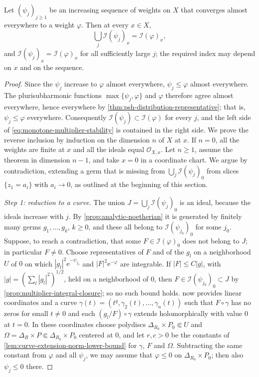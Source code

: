 \begin{theorem}\label{thm:monotone-multiplier-stability}
Let $(\psi_j)_{j\geq1}$ be an increasing sequence of weights on $X$ that converges almost everywhere to a weight $\varphi$. Then at every $x\in X$,
\begin{equation}\label{eq:monotone-multiplier-stability}
 \bigcup_j\mathcal I(\psi_j)_x=\mathcal I(\varphi)_x,
\end{equation}
and $\mathcal I(\psi_j)_x=\mathcal I(\varphi)_x$ for all sufficiently large $j$; the required index may depend on $x$ and on the sequence.
\end{theorem}
\begin{proof}
Since the $\psi_j$ increase to $\varphi$ almost everywhere, $\psi_j\leq\varphi$ almost everywhere. The plurisubharmonic functions $\max\{\psi_j,\varphi\}$ and $\varphi$ therefore agree almost everywhere, hence everywhere by \cref{thm:psh-distribution-representative}; that is, $\psi_j\leq\varphi$ everywhere. Consequently $\mathcal I(\psi_j)\subset\mathcal I(\varphi)$ for every $j$, and the left side of \eqref{eq:monotone-multiplier-stability} is contained in the right side. We prove the reverse inclusion by induction on the dimension $n$ of $X$ at $x$. If $n=0$, all the weights are finite at $x$ and all the ideals equal $\mathcal O_{X,x}$. Let $n\geq1$, assume the theorem in dimension $n-1$, and take $x=0$ in a coordinate chart. We argue by contradiction, extending a germ that is missing from $\bigcup_j\mathcal I(\psi_j)_0$ from slices $\{z_1=a_i\}$ with $a_i\to0$, as outlined at the beginning of this section.

\emph{Step 1: reduction to a curve.} The union $J=\bigcup_j\mathcal I(\psi_j)_0$ is an ideal, because the ideals increase with $j$. By \cref{prop:analytic-noetherian} it is generated by finitely many germs $g_1,\ldots,g_k$, $k\geq0$, and these all belong to $\mathcal I(\psi_{j_0})_0$ for some $j_0$. Suppose, to reach a contradiction, that some $F\in\mathcal I(\varphi)_0$ does not belong to $J$; in particular $F\neq0$. Choose representatives of $F$ and of the $g_l$ on a neighborhood $U$ of $0$ on which $|g_l|^2\mathrm e^{-\psi_{j_0}}$ and $|F|^2\mathrm e^{-\varphi}$ are integrable. If $|F|\leq C|g|$, with $|g|=(\sum_l|g_l|^2)^{1/2}$, held on a neighborhood of $0$, then $F\in\mathcal I(\psi_{j_0})_0\subset J$ by \cref{prop:multiplier-integral-closure}; so no such bound holds.  now provides linear coordinates and a curve $\gamma(t)=(t^q,\gamma_2(t),\ldots,\gamma_n(t))$ such that $F\circ\gamma$ has no zeros for small $t\neq0$ and each $(g_l/F)\circ\gamma$ extends holomorphically with value $0$ at $t=0$. In these coordinates choose polydiscs $\Delta_{R_0}\times P_0\Subset U$ and $\Omega=\Delta_R\times P\Subset\Delta_{R_0}\times P_0$ centered at $0$, and let $r,c>0$ be the constants of \cref{lem:curve-extension-norm-lower-bound} for $\gamma$, $F$ and $\Omega$. Subtracting the same constant from $\varphi$ and all $\psi_j$, we may assume that $\varphi\leq0$ on $\Delta_{R_0}\times P_0$; then also $\psi_j\leq0$ there.


\end{proof}
